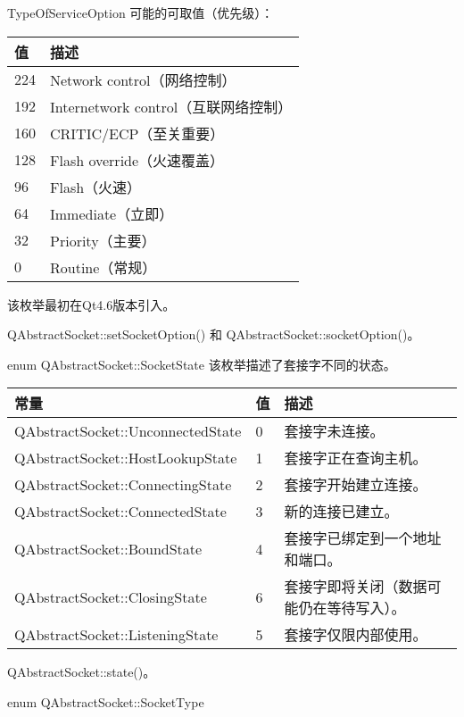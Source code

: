 TypeOfServiceOption 可能的可取值（优先级）：

\begin{tabular}{|l|l|}
\hline
值&	描述 \\
\hline
224&	Network control（网络控制）\\
\hline
192&	Internetwork control（互联网络控制）\\
\hline
160&	CRITIC/ECP（至关重要）\\
\hline
128&	Flash override（火速覆盖）\\
\hline
96&	Flash（火速）\\
\hline
64&	Immediate（立即）\\
\hline
32&	Priority（主要）\\
\hline
0&	Routine（常规） \\
\hline
\end{tabular}

该枚举最初在Qt4.6版本引入。

\begin{seeAlso}
QAbstractSocket::setSocketOption() 和 QAbstractSocket::socketOption()。
\end{seeAlso}


\splitLine

enum QAbstractSocket::SocketState
该枚举描述了套接字不同的状态。

\begin{tabular}{|l|l|l|}
\hline
常量&	值&	描述 \\ 
\hline
QAbstractSocket::UnconnectedState&	0&	套接字未连接。\\
\hline
QAbstractSocket::HostLookupState&	1&	套接字正在查询主机。\\
\hline
QAbstractSocket::ConnectingState&	2&	套接字开始建立连接。\\
\hline
QAbstractSocket::ConnectedState&	3&	新的连接已建立。\\
\hline
QAbstractSocket::BoundState&	4&	套接字已绑定到一个地址和端口。\\
\hline
QAbstractSocket::ClosingState&	6&	套接字即将关闭（数据可能仍在等待写入）。\\
\hline
QAbstractSocket::ListeningState&	5&	套接字仅限内部使用。\\
\hline
\end{tabular}


\begin{seeAlso}
QAbstractSocket::state()。
\end{seeAlso}

\splitLine

enum QAbstractSocket::SocketType

